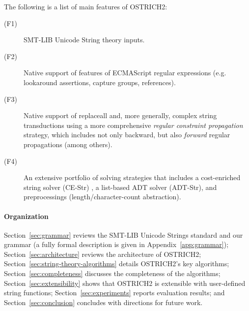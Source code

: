 The following is a list of main features  of OSTRICH2:
\begin{description}
    \item[(F1)] SMT-LIB Unicode String theory inputs.
    \item[(F2)] Native support of features of ECMAScript regular expressions (e.g. 
        lookaround assertions, capture groups, references).
    \item[(F3)] Native support of replaceall and, more generally, complex string
        transductions using a more comprehensive \emph{regular constraint
        propagation} strategy, which includes not only backward, but also 
        \emph{forward} regular propagations (among others).
    \item[(F4)] An extensive portfolio of solving strategies that includes
        a cost-enriched string solver (CE-Str) \cite{atva2020}, a list-based ADT 
        solver (ADT-Str), %
        and preprocessings (length/character-count abstraction).
\end{description}

\paragraph*{Organization} Section~\ref{sec:grammar} reviews the SMT-LIB 
Unicode Strings standard and our grammar (a fully formal description is given in Appendix~\ref{app:grammar}); Section~\ref{sec:architecture} reviews the architecture of OSTRICH2; Section~\ref{sec:string-theory-algorithms} details OSTRICH2’s key algorithms; Section~\ref{sec:completeness} discusses the completeness of the algorithms; Section~\ref{sec:extensibility} shows that OSTRICH2 is extensible with user-defined string functions; Section~\ref{sec:experiments} reports evaluation results; and Section~\ref{sec:conclusion} concludes with directions for future work.
